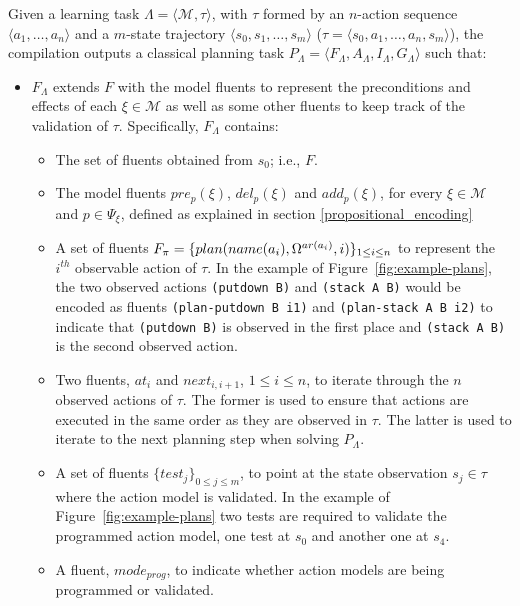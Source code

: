 \documentclass[runningheads]{llncs}
\newcommand{\tup}[1]{{\langle #1 \rangle}}
\begin{document}
Given a learning task $\Lambda=\tup{\mathcal{M},\tau}$, with $\tau$ formed by an $n$-action sequence $\tup{a_1, \ldots, a_n}$ and a $m$-state trajectory $\tup{s_0, s_1, \ldots, s_m}$ ($\tau = \langle s_0, a_1, \ldots, a_n, s_m \rangle$), the compilation outputs a classical planning task $P_{\Lambda}=\tup{F_{\Lambda},A_{\Lambda},I_{\Lambda},G_{\Lambda}}$ such that:

\begin{itemize}

\item $F_{\Lambda}$ extends $F$ with the model fluents to represent the preconditions and effects of each $\xi\in\mathcal{M}$ as well as some other fluents to keep track of the validation of $\tau$. Specifically, $F_{\Lambda}$ contains:
\begin{itemize}
\item The set of fluents obtained from $s_0$; i.e., $F$.
\item The model fluents $pre_p(\xi)$, $del_p(\xi)$ and $add_p(\xi)$, for every $\xi \in \mathcal{M}$ and $p\in \Psi_{\xi}$, defined as explained in section \ref{propositional_encoding}
\item A set of fluents $F_{\pi}=\{plan(name(a_i),\Omega^{ar(a_i)},i)\}_{\small 1\leq i\leq n}$ to represent the $i^{th}$ observable action of $\tau$. In the example of Figure~\ref{fig:example-plans}, the two observed actions {\small \texttt{(putdown B)}} and {\small \texttt{(stack  A  B)}} would be encoded as fluents  {\small \texttt{(plan-putdown B i1)}} and {\small \texttt{(plan-stack A B i2)}} to indicate that {\small \texttt{(putdown B)}} is observed in the first place and {\small \texttt{(stack  A  B)}} is the second observed action.
\item Two fluents, $at_i$ and $next_{i,i+1}$, {\small $1\leq i \leq n$}, to iterate through the $n$ observed actions of $\tau$. The former is used to ensure that actions are executed in the same order as they are observed in $\tau$. The latter is used to iterate to the next planning step when solving $P_{\Lambda}$.
\item A set of fluents $\{test_j\}_{0\leq j\leq m}$, to point at the state observation $s_j\in\tau$ where the action model is
validated. In the example of Figure~\ref{fig:example-plans} two tests are required to validate the programmed action model, one test at $s_0$ and another one at $s_4$.
\item A fluent, $mode_{prog}$, to indicate whether action models are being programmed or validated.
\end{itemize}


\end{itemize}
\end{document}
